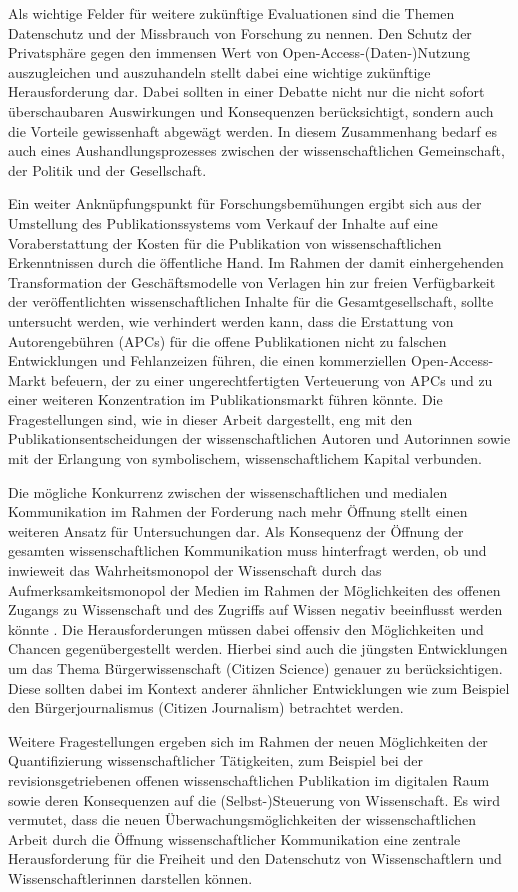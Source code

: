 Als wichtige Felder für weitere zukünftige Evaluationen sind die Themen Datenschutz und der Missbrauch von Forschung \cite{Fritsch_2015} zu nennen. Den Schutz der Privatsphäre gegen den immensen Wert von Open-Access-(Daten-)Nutzung auszugleichen und auszuhandeln stellt dabei eine wichtige zukünftige Herausforderung dar. Dabei sollten in einer Debatte nicht nur die nicht sofort überschaubaren Auswirkungen und Konsequenzen berücksichtigt, sondern auch die Vorteile gewissenhaft abgewägt werden. In diesem Zusammenhang bedarf es auch eines Aushandlungsprozesses zwischen der wissenschaftlichen Gemeinschaft, der Politik und der Gesellschaft.

Ein weiter Anknüpfungspunkt für Forschungsbemühungen ergibt sich aus der Umstellung des Publikationssystems vom Verkauf der Inhalte auf eine Voraberstattung der Kosten für die Publikation von wissenschaftlichen Erkenntnissen durch die öffentliche Hand. Im Rahmen der damit einhergehenden Transformation der Geschäftsmodelle von Verlagen hin zur freien Verfügbarkeit der veröffentlichten wissenschaftlichen Inhalte für die Gesamtgesellschaft, sollte untersucht werden, wie verhindert werden kann, dass die Erstattung von Autorengebühren (APCs) für die offene Publikationen nicht zu falschen Entwicklungen und Fehlanzeizen führen, die einen kommerziellen Open-Access-Markt befeuern, der zu einer ungerechtfertigten Verteuerung von APCs und zu einer weiteren Konzentration im Publikationsmarkt führen könnte. Die Fragestellungen sind, wie in dieser Arbeit dargestellt, eng mit den Publikationsentscheidungen der wissenschaftlichen Autoren und Autorinnen sowie mit der Erlangung von symbolischem, wissenschaftlichem Kapital verbunden.

Die mögliche Konkurrenz zwischen der wissenschaftlichen und medialen Kommunikation im Rahmen der Forderung nach mehr Öffnung stellt einen weiteren Ansatz für Untersuchungen dar. Als Konsequenz der Öffnung der gesamten wissenschaftlichen Kommunikation muss hinterfragt werden, ob und inwieweit das Wahrheitsmonopol der Wissenschaft durch das Aufmerksamkeitsmonopol der Medien im Rahmen der Möglichkeiten des offenen Zugangs zu Wissenschaft und des Zugriffs auf Wissen negativ beeinflusst werden könnte \cite{weingart_2005_wissenschaft}. Die Herausforderungen müssen dabei offensiv den Möglichkeiten und Chancen gegenübergestellt werden. Hierbei sind auch die jüngsten Entwicklungen um das Thema Bürgerwissenschaft (Citizen Science) genauer zu berücksichtigen. Diese sollten dabei im Kontext anderer ähnlicher Entwicklungen wie zum Beispiel den Bürgerjournalismus (Citizen Journalism) betrachtet werden.

Weitere Fragestellungen ergeben sich im Rahmen der neuen Möglichkeiten der Quantifizierung wissenschaftlicher Tätigkeiten, zum Beispiel bei der revisionsgetriebenen offenen wissenschaftlichen Publikation im digitalen Raum sowie deren Konsequenzen auf die (Selbst-)Steuerung von Wissenschaft. Es wird vermutet, dass die neuen Überwachungsmöglichkeiten der wissenschaftlichen Arbeit durch die Öffnung wissenschaftlicher Kommunikation eine zentrale Herausforderung für die Freiheit und den Datenschutz von Wissenschaftlern und Wissenschaftlerinnen darstellen können.
